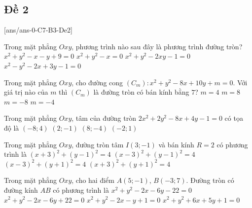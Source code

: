\newpage
\subsection{Đề 2}
[ans/ans-0-C7-B3-De2]
\caulc

\begin{ex}%
	Trong mặt phẳng $Oxy$, phương trình nào sau đây là phương trình đường tròn?
	\choice
	{$x^2+y^2-x-y+9=0$}
	{\True $x^2+y^2-x=0$}
	{$x^2+y^2-2xy-1=0$}
	{$x^2-y^2-2x+3y-1=0$}
\end{ex}
\begin{ex}%
	Trong mặt phẳng $Oxy$, cho đường cong $\left(C_m \right) \colon x^2+y^2-8x+10y+m=0$. Với giá trị nào của $m$ thì $\left(C_m \right)$ là đường tròn có bán kính bằng $7$?
	\choice
	{$m=4$}
	{$m=8$}
	{\True $m=-8$}
	{$m =-4$}
\end{ex}
\begin{ex}%
	Trong mặt phẳng $Oxy$, tâm của đường tròn $2x^2+2y^2-8x+4y-1=0$ có tọa độ là
	\choice
	{$(-8;4)$}
	{\True $(2;-1)$}
	{$(8;-4)$}
	{$(-2;1)$}
\end{ex}
\begin{ex}%
	Trong mặt phẳng $Oxy$, đường tròn tâm $I(3;-1)$ và bán kính $R=2$ có phương trình là
	\choice
	{$(x+3)^2+(y-1)^2=4$}
	{$(x-3)^2+(y-1)^2=4$}
	{\True $(x-3)^2+(y+1)^2=4$}
	{$(x+3)^2+(y+1)^2=4$}
\end{ex}
\begin{ex}%
	Trong mặt phẳng $Oxy$, cho hai điểm $A(5;-1)$, $B(-3;7)$. Đường tròn có đường kính $AB$ có phương trình là
	\choice
	{\True $x^2+y^2-2x-6y-22=0$}
	{$x^2+y^2-2x-6y+22=0$}
	{$x^2+y^2-2x-y+1=0$}
	{$x^2+y^2+6x+5y+1=0$}
\end{ex}
